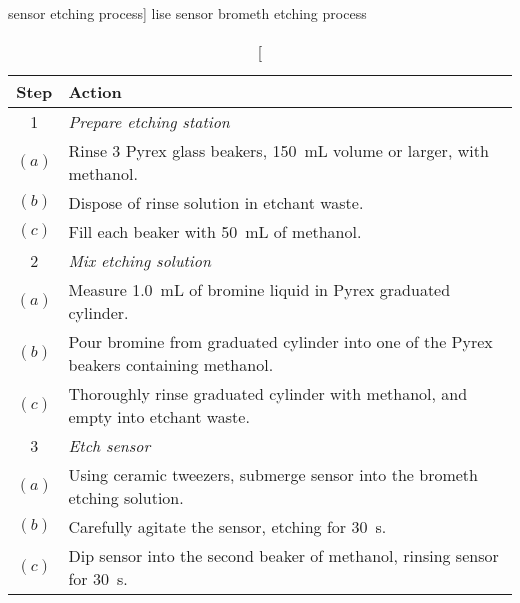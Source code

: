 \documentclass[../main.tex]{subfiles}%
\begin{document}
%
    \Xtable%
    \begin{table}[p]%
        \caption%
            [ sensor  etching process]%
            {\Gls{lise} sensor \gls{brometh} etching process}%
        \label{tbl:sensor-etch-process}%
        \begin{tabu}{ c p{5.00in} }%
            \toprule%
            \centering\textbf{Step} &%
            \centering\textbf{Action}\\%
            \toprule%
            1 & \textit{Prepare etching station}\\%
            $(a)$ & Rinse 3 Pyrex glass beakers, \SI{150}{\milli\liter} volume or larger, with \gls{methanol}.\\%
            $(b)$ & Dispose of rinse solution in etchant waste.\\%
            $(c)$ & Fill each beaker with \SI{50}{\milli\liter} of \gls{methanol}.\\%
            \midrule%
            2 & \textit{Mix etching solution}\\%
            $(a)$ & Measure \SI{1.0}{\milli\liter} of bromine liquid in Pyrex graduated cylinder.\\%
            $(b)$ & Pour bromine from graduated cylinder into one of the Pyrex beakers containing \gls{methanol}.\\
            $(c)$ & Thoroughly rinse graduated cylinder with \gls{methanol}, and empty into etchant waste.\\%
            \midrule%
            3 & \textit{Etch sensor}\\%
            $(a)$ & Using ceramic tweezers, submerge sensor into the \gls{brometh} etching solution.\\%
            $(b)$ & Carefully agitate the sensor, etching for \SI{30}{\second}.\\%
            $(c)$ & Dip sensor into the second beaker of \gls{methanol}, rinsing sensor for \SI{30}{\second}.\\%

\end{tabu}
\end{table}
\end{document}
